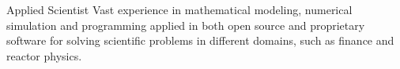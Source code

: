 
\begin{cvskills}

	\cvskill
	{Applied Scientist} {Vast experience in mathematical modeling, numerical simulation and
		programming applied in both open source and proprietary software for solving
		scientific problems in different domains, such as finance and reactor physics.}

\end{cvskills}
